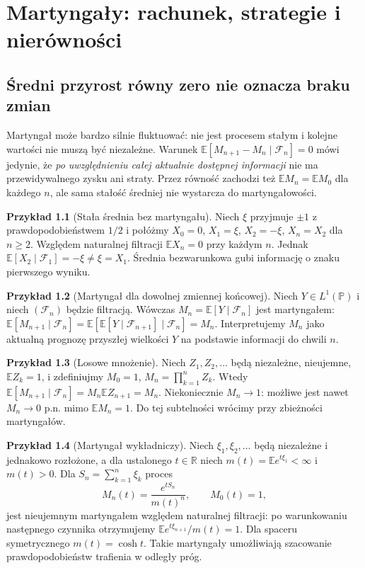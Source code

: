 \documentclass[11pt,a4paper,oneside]{report}
\numberwithin{equation}{chapter}
\theoremstyle{plain}
\theoremstyle{definition}
\newtheorem{przyklad}{Przykład}[chapter]
\theoremstyle{remark}
\newcommand{\R}{\mathbb{R}}
\newcommand{\Prob}{\mathbb{P}}
\newcommand{\E}{\mathbb{E}}
\begin{document}
\chapter{Martyngały: rachunek, strategie i nierówności}
\label{ch:martyngaly}

\section{Średni przyrost równy zero nie oznacza braku zmian}

Martyngał może bardzo silnie fluktuować: nie jest
procesem stałym i kolejne wartości nie muszą być
niezależne. Warunek
$\E[M_{n+1}-M_n\mid\mathcal F_n]=0$
mówi jedynie, że \emph{po uwzględnieniu całej
aktualnie dostępnej informacji} nie ma
przewidywalnego zysku ani straty.
Przez równość zachodzi też
$\E M_n=\E M_0$ dla każdego $n$,
ale sama stałość średniej nie wystarcza do
martyngałowości.

\begin{przyklad}[Stała średnia bez martyngału]
Niech $\xi$ przyjmuje $\pm1$ z prawdopodobieństwem
$1/2$ i połóżmy $X_0=0$, $X_1=\xi$,
$X_2=-\xi$, $X_n=X_2$ dla $n\geq2$.
Względem naturalnej filtracji $\E X_n=0$
przy każdym $n$. Jednak
$\E[X_2\mid\mathcal F_1]=-\xi\ne\xi=X_1$.
Średnia bezwarunkowa gubi informację o znaku
pierwszego wyniku.
\end{przyklad}

\begin{przyklad}[Martyngał dla dowolnej zmiennej końcowej]
Niech $Y\in L^1(\Prob)$ i niech $(\mathcal F_n)$
będzie filtracją. Wówczas
$M_n=\E[Y\mid\mathcal F_n]$ jest martyngałem:
$\E[M_{n+1}\mid\mathcal F_n]=
\E[\E[Y\mid\mathcal F_{n+1}]\mid\mathcal F_n]=M_n$.
Interpretujemy $M_n$ jako aktualną prognozę
przyszłej wielkości $Y$ na podstawie informacji
do chwili $n$.
\end{przyklad}

\begin{przyklad}[Losowe mnożenie]
Niech $Z_1,Z_2,\ldots$ będą niezależne, nieujemne,
$\E Z_k=1$, i zdefiniujmy $M_0=1$,
$M_n=\prod_{k=1}^n Z_k$.
Wtedy $\E[M_{n+1}\mid\mathcal F_n]
=M_n\E Z_{n+1}=M_n$.
Niekoniecznie $M_n\to1$: możliwe jest nawet
$M_n\to0$ p.n. mimo $\E M_n=1$.
Do tej subtelności wrócimy przy zbieżności
martyngałów.
\end{przyklad}

\begin{przyklad}[Martyngał wykładniczy]
Niech $\xi_1,\xi_2,\ldots$ będą niezależne i jednakowo
rozłożone, a dla ustalonego $t\in\R$
niech $m(t)=\E e^{t\xi_1}<\infty$ i $m(t)>0$.
Dla $S_n=\sum_{k=1}^n\xi_k$ proces
\[
M_n(t)=\frac{e^{tS_n}}{m(t)^n},\qquad M_0(t)=1,
\]
jest nieujemnym martyngałem względem naturalnej
filtracji: po warunkowaniu następnego czynnika
otrzymujemy $\E e^{t\xi_{n+1}}/m(t)=1$.
Dla spaceru symetrycznego $m(t)=\cosh t$.
Takie martyngały umożliwiają szacowanie
prawdopodobieństw trafienia w odległy próg.
\end{przyklad}
\end{document}
